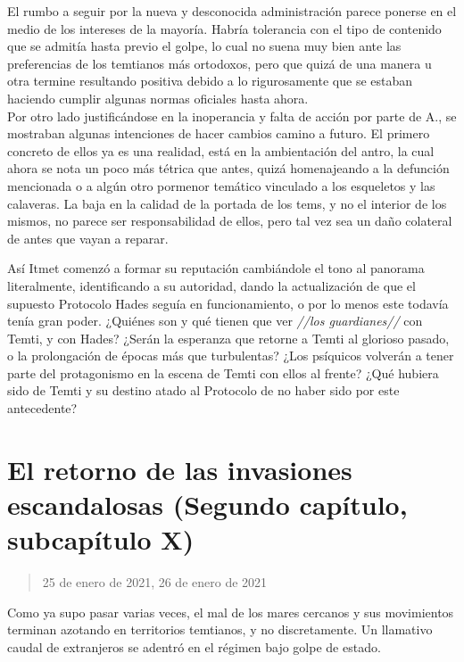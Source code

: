 \documentclass[
  spanish,
]{book}
\begin{document}
El rumbo a seguir por la nueva y desconocida administración parece ponerse en el medio de los intereses de la mayoría. Habría tolerancia con el tipo de contenido que se admitía hasta previo el golpe, lo cual no suena muy bien ante las preferencias de los temtianos más ortodoxos, pero que quizá de una manera u otra termine resultando positiva debido a lo rigurosamente que se estaban haciendo cumplir algunas normas oficiales hasta ahora.\\
Por otro lado justificándose en la inoperancia y falta de acción por parte de A., se mostraban algunas intenciones de hacer cambios camino a futuro. El primero concreto de ellos ya es una realidad, está en la ambientación del antro, la cual ahora se nota un poco más tétrica que antes, quizá homenajeando a la defunción mencionada o a algún otro pormenor temático vinculado a los esqueletos y las calaveras. La baja en la calidad de la portada de los tems, y no el interior de los mismos, no parece ser responsabilidad de ellos, pero tal vez sea un daño colateral de antes que vayan a reparar.

Así Itmet comenzó a formar su reputación cambiándole el tono al panorama literalmente, identificando a su autoridad, dando la actualización de que el supuesto Protocolo Hades seguía en funcionamiento, o por lo menos este todavía tenía gran poder. ¿Quiénes son y qué tienen que ver \emph{//los guardianes//} con Temti, y con Hades? ¿Serán la esperanza que retorne a Temti al glorioso pasado, o la prolongación de épocas más que turbulentas? ¿Los psíquicos volverán a tener parte del protagonismo en la escena de Temti con ellos al frente? ¿Qué hubiera sido de Temti y su destino atado al Protocolo de no haber sido por este antecedente?

\hypertarget{el-retorno-de-las-invasiones-escandalosas-segundo-capuxedtulo-subcapuxedtulo-x}{%
\section{El retorno de las invasiones escandalosas (Segundo capítulo, subcapítulo X)}\label{el-retorno-de-las-invasiones-escandalosas-segundo-capuxedtulo-subcapuxedtulo-x}}

\begin{quote}
25 de enero de 2021, 26 de enero de 2021
\end{quote}

Como ya supo pasar varias veces, el mal de los mares cercanos y sus movimientos terminan azotando en territorios temtianos, y no discretamente. Un llamativo caudal de extranjeros se adentró en el régimen bajo golpe de estado.
\end{document}
